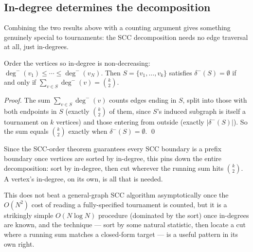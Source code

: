 \documentclass[11pt]{article}
\begin{document}
\subsection{In-degree determines the decomposition}
Combining the two results above with a counting argument gives something
genuinely special to tournaments: the SCC decomposition needs no edge
traversal at all, just in-degrees.

\begin{theorembox}
Order the vertices so in-degree is non-decreasing:
$\deg^-(v_1) \le \cdots \le \deg^-(v_N)$. Then $S = \{v_1, \ldots, v_k\}$
satisfies $\delta^-(S) = \emptyset$ if and only if
$\sum_{v \in S} \deg^-(v) = \binom{k}{2}$.

\emph{Proof.} The sum $\sum_{v\in S}\deg^-(v)$ counts edges ending in $S$,
split into those with both endpoints in $S$ (exactly $\binom{k}{2}$ of
them, since $S$'s induced subgraph is itself a tournament on $k$
vertices) and those entering from outside (exactly $|\delta^-(S)|$). So
the sum equals $\binom{k}{2}$ exactly when $\delta^-(S) = \emptyset$. \qed
\end{theorembox}

Since the SCC-order theorem guarantees every SCC boundary is a prefix
boundary once vertices are sorted by in-degree, this pins down the entire
decomposition: sort by in-degree, then cut wherever the running sum hits
$\binom{k}{2}$. A vertex's in-degree, on its own, is all that is needed.

\begin{notebox}
This does not beat a general-graph SCC algorithm asymptotically once the
$O(N^2)$ cost of reading a fully-specified tournament is counted, but it
is a strikingly simple $O(N \log N)$ procedure (dominated by the sort)
once in-degrees are known, and the technique --- sort by some natural
statistic, then locate a cut where a running sum matches a closed-form
target --- is a useful pattern in its own right.
\end{notebox}
\end{document}
